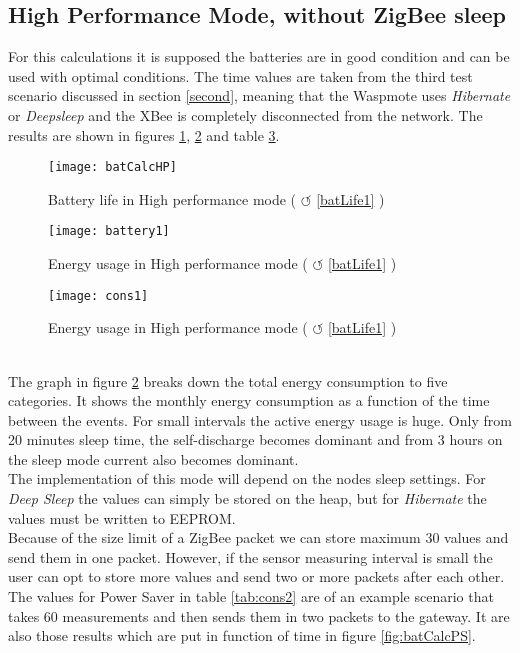 \subsection{High Performance Mode, without ZigBee sleep}
For this calculations it is supposed the batteries are in good condition and can be used with optimal conditions. The time values are taken from the third test scenario discussed in section \ref{second}, meaning that the Waspmote uses \textit{Hibernate} or \textit{Deepsleep} and the XBee is completely disconnected from the network.
The results are shown in figures \ref{fig:batCalcHP}, \ref{fig:batCalcHP1} and table \ref{fig:consump}.\\
\begin{figure}[htbp]
\centering
\texttt{[image: batCalcHP]}
\caption{Battery life in High performance mode ( $\circlearrowleft$ \ref{batLife1} )}
\label{fig:batCalcHP}
\end{figure}
\begin{figure}[htbp]
\centering
\texttt{[image: battery1]}
\caption{Energy usage in High performance mode ( $\circlearrowleft$ \ref{batLife1} )}
\label{fig:batCalcHP1}
\end{figure}
\begin{figure}[htbp]
\centering
\texttt{[image: cons1]}
\caption{Energy usage in High performance mode ( $\circlearrowleft$ \ref{batLife1} )}
\label{fig:consump}
\end{figure}\\
\vfill
\pagebreak
\noindent
The graph in figure \ref{fig:batCalcHP1} breaks down the total energy consumption to five categories. It shows the monthly energy consumption as a function of the time between the events. For small intervals the active energy usage is huge. Only from 20 minutes sleep time, the self-discharge becomes dominant and from 3 hours on the sleep mode current also becomes dominant.\\
The implementation of this mode will depend on the nodes sleep settings. For \textit{Deep Sleep} the values can simply be stored on the heap, but for \textit{Hibernate} the values must be written to EEPROM.\\
Because of the size limit of a ZigBee packet we can store maximum 30 values and send them in one packet. However, if the sensor measuring interval is small the user can opt to store more values and send two or more packets after each other. The values for Power Saver in table \ref{tab:cons2} are of an example scenario that takes 60 measurements and then sends them in two packets to the gateway. It are also those results which are put in function of time in figure \ref{fig:batCalcPS}.\\
